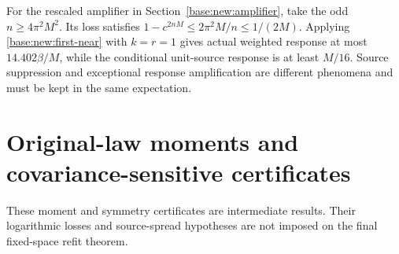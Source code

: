 \documentclass[11pt,oneside,openany,a4paper]{book}
\numberwithin{equation}{chapter}
\theoremstyle{definition}
\theoremstyle{remark}
\newcommand{\proofstep}[1]{\par\addvspace{.45\baselineskip}\Needspace{3\baselineskip}\textbf{#1}\par\nobreak}
\newcommand{\R}{\mathbb R}\newcommand{\E}{\mathbb E}\newcommand{\Prb}{\mathbb P}\newcommand{\PP}{\mathbb P}
\newcommand{\T}{\mathsf T}\newcommand{\Id}{I}
\newcommand{\F}[1]{\left\lVert#1\right\rVert_F}
\newcommand{\N}[1]{\left\lVert#1\right\rVert}
\newcommand{\op}[1]{\left\lVert#1\right\rVert_{\rm op}}
\newcommand{\ip}[2]{\left\langle#1,#2\right\rangle_F}
\DeclareMathOperator{\tr}{tr}\DeclareMathOperator{\rank}{rank}
\DeclareMathOperator{\diag}{blockdiag}\DeclareMathOperator{\range}{range}
\DeclareMathOperator{\HSS}{HSS}\DeclareMathOperator{\dist}{dist}
\DeclareMathOperator{\Var}{Var}\DeclareMathOperator{\supp}{supp}
\newcommand{\UC}{\mathcal U}\newcommand{\VC}{\mathcal V}\newcommand{\err}{\mathcal E}
\newcommand{\Sn}[2]{\left\lVert#1\right\rVert_{S_{#2}}}
\newcommand{\Cov}{\mathsf C}\newcommand{\Loss}{\mathsf L}\newcommand{\Fil}{\mathcal F}
\DeclareMathOperator{\diver}{div}\DeclareMathOperator{\vecop}{vec}\DeclareMathOperator{\Gammafun}{Gamma}
\begin{document}
For the rescaled amplifier in Section~\ref{base:new:amplifier}, take the odd $n\ge4\pi^2M^2$. Its loss satisfies $1-c^{2nM}\le2\pi^2M/n\le1/(2M)$. Applying \eqref{base:new:first-near} with $k=r=1$ gives actual weighted response at most $14.402\beta/M$, while the conditional unit-source response is at least $M/16$. Source suppression and exceptional response amplification are different phenomena and must be kept in the same expectation.


\endgroup

\begingroup
\let\R\relax
\newcommand{\R}{\mathbb R}
\let\E\relax
\newcommand{\E}{\mathbb E}
\let\Prb\relax
\newcommand{\Prb}{\mathbb P}
\let\T\relax
\newcommand{\T}{\mathsf T}
\let\F\relax
\newcommand{\F}[1]{\left\lVert#1\right\rVert_{F}}
\let\N\relax
\newcommand{\N}[1]{\left\lVert#1\right\rVert}
\let\ip\relax
\newcommand{\ip}[2]{\left\langle#1,#2\right\rangle_F}
\let\tr\relax
\newcommand{\tr}{\operatorname{tr}}
\let\rank\relax
\newcommand{\rank}{\operatorname{rank}}
\let\diag\relax
\newcommand{\diag}{\operatorname{blockdiag}}
\let\range\relax
\newcommand{\range}{\operatorname{range}}
\let\OPT\relax
\newcommand{\OPT}{\operatorname{OPT}}
\let\HSS\relax
\newcommand{\HSS}{\operatorname{HSS}}
\let\diver\relax
\newcommand{\diver}{\operatorname{div}}
\let\Var\relax
\newcommand{\Var}{\operatorname{Var}}
\let\UC\relax
\newcommand{\UC}{\mathcal U}
\let\VC\relax
\newcommand{\VC}{\mathcal V}
\let\err\relax
\newcommand{\err}{\mathcal E}
\let\proofstep\relax
\newcommand{\proofstep}[1]{\par\addvspace{.45\baselineskip}\Needspace{3\baselineskip}\textbf{#1}\par\nobreak}
\let\op\relax
\newcommand{\op}[1]{\left\lVert#1\right\rVert_{\mathrm{op}}}
\let\Sn\relax
\newcommand{\Sn}[2]{\left\lVert#1\right\rVert_{S_{#2}}}
\let\Cov\relax
\newcommand{\Cov}{\mathsf C}
\let\Loss\relax
\newcommand{\Loss}{\mathsf L}
\let\Fil\relax
\newcommand{\Fil}{\mathcal F}
\let\Id\relax
\newcommand{\Id}{I}
\let\supp\relax
\newcommand{\supp}{\operatorname{supp}}
\let\vecop\relax
\newcommand{\vecop}{\operatorname{vec}}
\let\Gammafun\relax
\newcommand{\Gammafun}{\operatorname{Gamma}}
\chapter{Original-law moments and covariance-sensitive certificates}\label{ch:moments}
\begin{scopebox}
These moment and symmetry certificates are intermediate results. Their logarithmic losses and source-spread hypotheses are not imposed on the final fixed-space refit theorem.
\end{scopebox}
\end{document}
